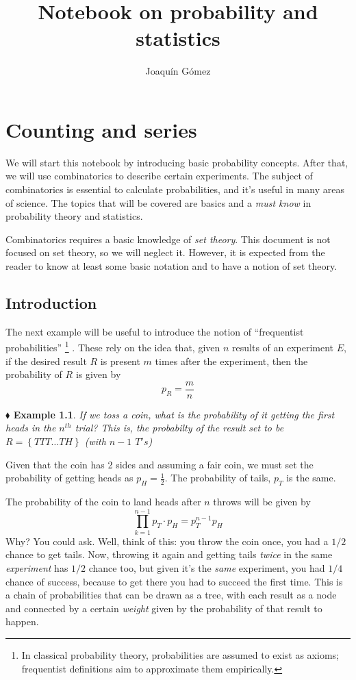 \documentclass{report}
\title{Notebook on probability and statistics}
\author{Joaquín Gómez}
\date{}
\newcounter{daggerfootnote}
\newcommand*{\daggerfootnote}[1]{%
    \setcounter{daggerfootnote}{\value{footnote}}%
    \renewcommand*{\thefootnote}{\fnsymbol{footnote}}%
    \footnote[2]{#1}%
    \setcounter{footnote}{\value{daggerfootnote}}%
    \renewcommand*{\thefootnote}{\arabic{footnote}}%
    }
\newtheorem{example}{$\blacklozenge$ Example}[chapter]
\begin{document}
\maketitle
\chapter{Counting and series}
We will start this notebook by introducing basic probability concepts.
After that, we will use combinatorics to describe certain experiments.
The subject of combinatorics is essential to calculate probabilities,
and it's useful in many areas of science.
The topics that will be covered are basics and a \textit{must know} in
probability theory and statistics.

Combinatorics requires a basic knowledge of \textit{set theory}. This
document is not focused on set theory, so we will neglect it. However,
it is expected from the reader to know at least some basic notation and
to have a notion of set theory.

\section{Introduction}
The next example will be useful to introduce the notion of ``frequentist probabilities''\daggerfootnote{
    In classical probability theory, probabilities are assumed to exist as axioms; frequentist definitions aim to approximate them empirically.
}. These
rely on the idea that, given $n$ results of an experiment $E$, if the desired result $R$
is present $m$ times after the experiment, then the probability of $R$ is given by
\begin{equation}
    p_R = \frac{m}{n}
\end{equation}

\begin{example}
    If we toss a coin, what is the probability of it getting the first heads in the $n^{th}$ trial?
    This is, the probabilty of the result set to be $R = \left\{T T T \dots T H\right\}$
    (with $n-1$ $T's$)
\end{example}
Given that the coin has 2 sides and assuming a fair coin, we must set the probability of getting
heads as $p_H = \frac{1}{2}$. The probability of tails, $p_T$ is the same.

The probability of the coin to land heads after $n$ throws will be given by
\begin{equation}
    \prod_{k=1}^{n-1}{p_T} \cdot p_H = p_T^{n-1}p_H
\end{equation}
Why? You could ask. Well, think of this: you throw the coin once, you had a $1/2$ chance to get
tails. Now, throwing it again and getting tails \textit{twice} in the same \textit{experiment}
has $1/2$ chance too, but given it's the \textit{same} experiment, you had $1/4$ chance of success,
because to get there you had to succeed the first time. This is a chain of probabilities that
can be drawn as a tree, with each result as a node and connected by a certain \textit{weight} given
by the probability of that result to happen.
\end{document}
